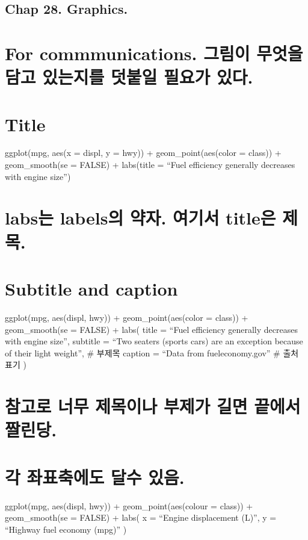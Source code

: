 \documentclass[]{article}
\begin{document}
\subsection{Chap 28. Graphics.}\label{chap-28.-graphics.}

\section{For commmunications. 그림이 무엇을 담고 있는지를 덧붙일 필요가
있다.}\label{for-commmunications.-------.}

\section{Title}\label{title}

ggplot(mpg, aes(x = displ, y = hwy)) + geom\_point(aes(color = class)) +
geom\_smooth(se = FALSE) + labs(title = ``Fuel efficiency generally
decreases with engine size'')

\section{labs는 labels의 약자. 여기서 title은
제목.}\label{labs-labels-.--title-.}

\section{Subtitle and caption}\label{subtitle-and-caption}

ggplot(mpg, aes(displ, hwy)) + geom\_point(aes(color = class)) +
geom\_smooth(se = FALSE) + labs( title = ``Fuel efficiency generally
decreases with engine size'', subtitle = ``Two seaters (sports cars) are
an exception because of their light weight'', \# 부제목 caption = ``Data
from fueleconomy.gov'' \# 출처 표기 )

\section{참고로 너무 제목이나 부제가 길면 끝에서 짤린당.}\label{------.}

\section{각 좌표축에도 달수 있음.}\label{---.}

ggplot(mpg, aes(displ, hwy)) + geom\_point(aes(colour = class)) +
geom\_smooth(se = FALSE) + labs( x = ``Engine displacement (L)'', y =
``Highway fuel economy (mpg)'' )
\end{document}
